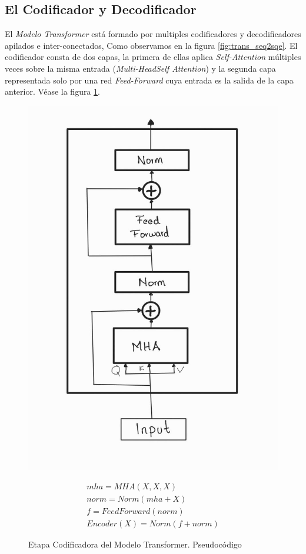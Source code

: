 \subsection{El Codificador y Decodificador}

El \textit{Modelo Transformer} está formado por multiples codificadores  y decodificadores apilados e inter-conectados,
Como observamos en la figura \ref{fig:trans_seq2sqe}. El codificador consta de dos capas,
la primera de ellas aplica \textit{Self-Attention} múltiples veces sobre la misma entrada
(\textit{Multi-HeadSelf Attention}) y la segunda capa representada solo por una red
\textit{Feed-Forward} cuya entrada es la salida de la capa anterior.
Véase la figura \ref{fig:trans_encoder}.


\begin{figure}[ht!]
\centering
    \begin{minipage}{.4\textwidth}
        \centering
        \includegraphics[width=0.7 \textwidth]{Chapters/2. Transformer/Figures/transformer/encoder.jpg}
    \end{minipage}
    \begin{minipage}{.5\textwidth}
        \begin{equation*}
            \begin{split}
                mha = MHA(X, X, X)\\
                norm = Norm( mha + X)\\
                f = FeedForward(norm)\\
                Encoder(X) = Norm(f + norm)
            \end{split}
            \label{eq:trans_enc}
        \end{equation*}
    \end{minipage}
    \caption{Etapa Codificadora del Modelo Transformer. Pseudocódigo}
    \label{fig:trans_encoder}
\end{figure}



